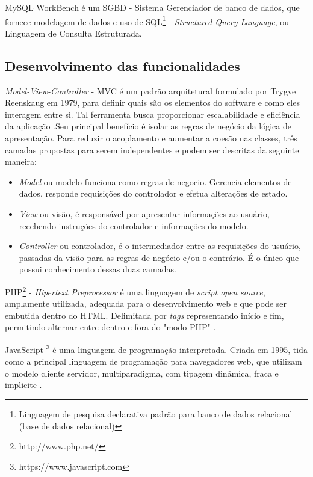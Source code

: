 MySQL WorkBench é um SGBD - Sistema Gerenciador de banco de dados, que fornece modelagem de dados e uso de SQL\footnote{ Linguagem de pesquisa declarativa padrão para banco de dados relacional (base de dados relacional)}   - \textit{Structured Query Language}, ou Linguagem de Consulta Estruturada. 

\subsection{Desenvolvimento das funcionalidades}

\textit{Model-View-Controller} - MVC é um padrão arquitetural formulado por Trygve Reenskaug em 1979, para definir quais são os elementos do software e como eles interagem entre si. Tal ferramenta busca proporcionar escalabilidade e eficiência da aplicação \cite{Karam2009SynchronousOH}.Seu principal benefício é isolar as regras de negócio da lógica de apresentação. Para reduzir o acoplamento e aumentar a coesão nas classes, três camadas propostas para serem independentes e podem ser descritas da seguinte maneira:

\begin{itemize}
	\item[]\qquad\textit{Model} ou modelo funciona como regras de negocio. Gerencia elementos de dados, responde requisições do controlador e efetua alterações de estado.
	\item[]\qquad\textit{View} ou visão, é responsável por apresentar informações ao usuário, recebendo instruções do controlador e informações do modelo.
	\item[]\qquad\textit{Controller} ou controlador, é o intermediador entre as requisições do usuário, passadas da visão para as regras de negócio e/ou o contrário. É o único que possui conhecimento dessas duas camadas.
\end{itemize}




PHP\footnote{http://www.php.net/} -\textit{ Hipertext Preprocessor}  é uma linguagem de \textit{script open source}, amplamente utilizada, adequada para o desenvolvimento web e que pode ser embutida dentro do HTML. Delimitada por \textit{tags} representando início e fim, permitindo alternar entre dentro e fora do "modo PHP" \cite{tonu2012php}.


JavaScript \footnote{https://www.javascript.com}  é uma linguagem de programação interpretada. Criada em 1995, tida como a principal linguagem de programação para navegadores web, que utilizam o modelo cliente servidor, multiparadigma, com tipagem dinâmica, fraca e implicite \cite{javaScript2011}.


